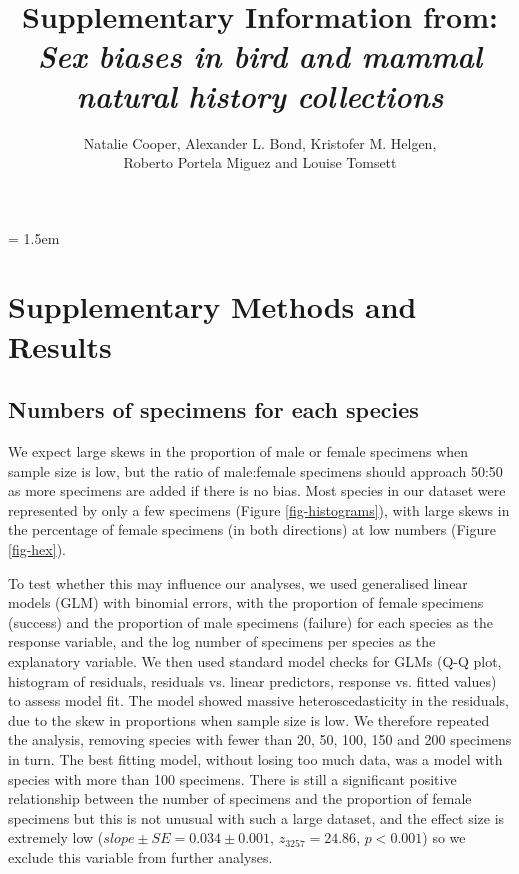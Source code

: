 \documentclass[a4paper, 12pt]{article}
\title{Supplementary Information from: \textit{Sex biases in bird and mammal natural history collections}}
\author{Natalie Cooper, 
  Alexander L. Bond,
  Kristofer M. Helgen,\\
  Roberto Portela Miguez and
  Louise Tomsett}
\date{}
\begin{document}
\maketitle

\parindent = 1.5em
\addtolength{\parskip}{.3em}


\newpage
\section*{Supplementary Methods and Results}

\subsection*{Numbers of specimens for each species}

We expect large skews in the proportion of male or female specimens when sample size is low, but the ratio of male:female specimens should approach 50:50 as more specimens are added if there is no bias. 
Most species in our dataset were represented by only a few specimens (Figure \ref{fig-histograms}), with large skews in the percentage of female specimens (in both directions) at low numbers (Figure \ref{fig-hex}).

To test whether this may influence our analyses, we used generalised linear models (GLM) with binomial errors, with the proportion of female specimens (success) and the proportion of male specimens (failure) for each species as the response variable, and the log number of specimens per species as the explanatory variable. 
We then used standard model checks for GLMs (Q-Q plot, histogram of residuals, residuals vs. linear predictors, response vs. fitted values) to assess model fit. 
The model showed massive heteroscedasticity in the residuals, due to the skew in proportions when sample size is low. 
We therefore repeated the analysis, removing species with fewer than 20, 50, 100, 150 and 200 specimens in turn. 
The best fitting model, without losing too much data, was a model with species with more than 100 specimens. 
There is still a significant positive relationship between the number of specimens and the proportion of female specimens but this is not unusual with such a large dataset, and the effect size is extremely low ($slope \pm SE = 0.034 \pm 0.001$, $z_3257 = 24.86$, $p < 0.001$) so we exclude this variable from further analyses.
\end{document}
